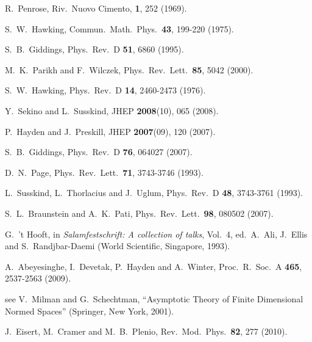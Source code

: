 \documentclass[aps,12pt]{revtex4}
\begin{document}
\begin{thebibliography}{16}

 R.\ Penrose,
Riv.\ Nuovo Cimento, {\bf 1}, 252 (1969).

 S.\ W.\ Hawking,
Commun.\ Math.\ Phys.\ {\bf 43}, 199-220 (1975).

 S.\ B.\ Giddings,
Phys.\ Rev.\ D {\bf 51}, 6860 (1995).

 M.\ K.\ Parikh and F.\ Wilczek,
Phys.\ Rev.\ Lett.\ {\bf 85}, 5042 (2000).

 S.\ W.\ Hawking,
Phys.\ Rev.\ D {\bf 14}, 2460-2473 (1976).

 Y.\ Sekino and L.\ Susskind,
JHEP {\bf 2008}(10), 065 (2008).

 P.\ Hayden and J.\ Preskill,
JHEP {\bf 2007}(09), 120 (2007).

 S.\ B.\ Giddings,
Phys.\ Rev.\ D {\bf 76}, 064027 (2007).

 D.\ N.\ Page,
Phys.\ Rev.\ Lett.\ {\bf 71}, 3743-3746 (1993).

 L.\ Susskind, L.\ Thorlacius and J.\ Uglum,
Phys.\ Rev.\ D {\bf 48}, 3743-3761 (1993).

 S.\ L.\ Braunstein and A.\ K.\ Pati,
Phys.\ Rev.\ Lett.\ {\bf 98}, 080502 (2007).

 G.\ 't Hooft,
in {\it Salamfestschrift: A collection of talks}, 
Vol.\ 4, ed.\ A.\ Ali, J.\ Ellis and S.\ Randjbar-Daemi
(World Scientific, Singapore, 1993).

 A.\ Abeyesinghe, I.\ Devetak, P.\ Hayden and A.\ Winter,
Proc.\ R.\ Soc.\ A {\bf 465}, 2537-2563 (2009). 

 see
V.\ Milman and G.\ Schechtman,
``Asymptotic Theory of Finite Dimensional Normed Spaces''
(Springer, New York, 2001).

 J.\ Eisert, M.\ Cramer and M.\ B.\ Plenio,
Rev.\ Mod.\ Phys.\ {\bf 82}, 277 (2010).


\end{thebibliography}
\end{document}
